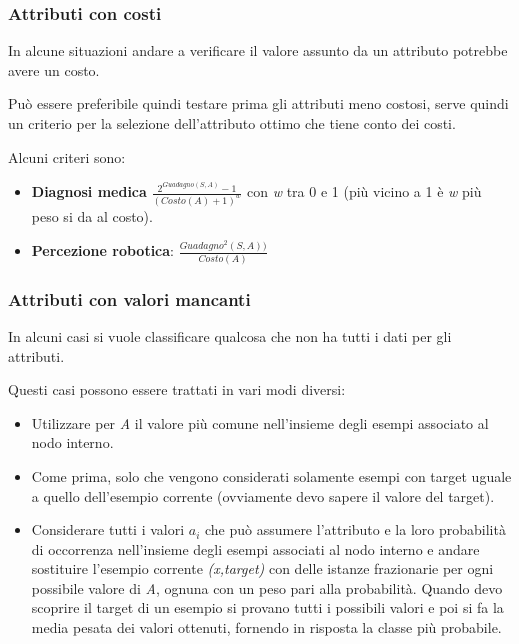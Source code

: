 \subsubsection{Attributi con costi}\label{attributi-con-costi}

In alcune situazioni andare a verificare il valore assunto da un
attributo potrebbe avere un costo.

Può essere preferibile quindi testare prima gli attributi meno costosi,
serve quindi un criterio per la selezione dell'attributo ottimo che
tiene conto dei costi.

Alcuni criteri sono:

\begin{itemize}
\item \textbf{Diagnosi medica} $\frac{2^{Guadagno(S,A)}-1}{(Costo(A)+1)^w}$ con
\emph{w} tra 0 e 1 (più vicino a 1 è \emph{w} più peso si da al costo).

\item \textbf{Percezione robotica}: $\frac{Guadagno^2(S,A))}{Costo(A)}$
\end{itemize}

\subsubsection{Attributi con valori mancanti}\label{attributi-con-valori-mancanti}

In alcuni casi si vuole classificare qualcosa che non ha tutti i dati
per gli attributi.

Questi casi possono essere trattati in vari modi diversi:

\begin{itemize}
\item
  Utilizzare per \emph{A} il valore più comune nell'insieme degli esempi
  associato al nodo interno.
\item
  Come prima, solo che vengono considerati solamente esempi con target
  uguale a quello dell'esempio corrente (ovviamente devo sapere il
  valore del target).
\item
  Considerare tutti i valori $a_i$ che può assumere l'attributo e la
  loro probabilità di occorrenza nell'insieme degli esempi associati al
  nodo interno e andare sostituire l'esempio corrente \emph{(x,target)}
  con delle istanze frazionarie per ogni possibile valore di \emph{A},
  ognuna con un peso pari alla probabilità. Quando devo scoprire il
  target di un esempio si provano tutti i possibili valori e poi si fa la media pesata dei valori ottenuti, fornendo in risposta la classe più probabile.
\end{itemize}

